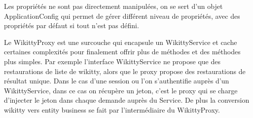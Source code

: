 Les propriétés ne sont pas directement manipulées, on se sert d'un objet 
ApplicationConfig qui permet de gérer différent niveau de propriétés,
avec des propriétés par défaut si tout n'est pas défini.

Le WikittyProxy est une surcouche qui encapsule un WikittyService et cache 
certaines complexités pour finalement offrir plus de méthodes et des méthodes 
plus simples. Par exemple l'interface WikittyService ne propose que des 
restaurations de liste de wikitty, alors que le proxy propose des restaurations de résultat
unique. Dans le cas d'une session ou l'on s'authentifie auprès d'un WikittyService,
 dans ce cas on récupère un jeton, c'est le proxy qui se charge d'injecter le
jeton dans chaque demande auprès du Service. De plus la conversion wikitty
vers entity business se fait par l'intermédiaire du WikittyProxy.
